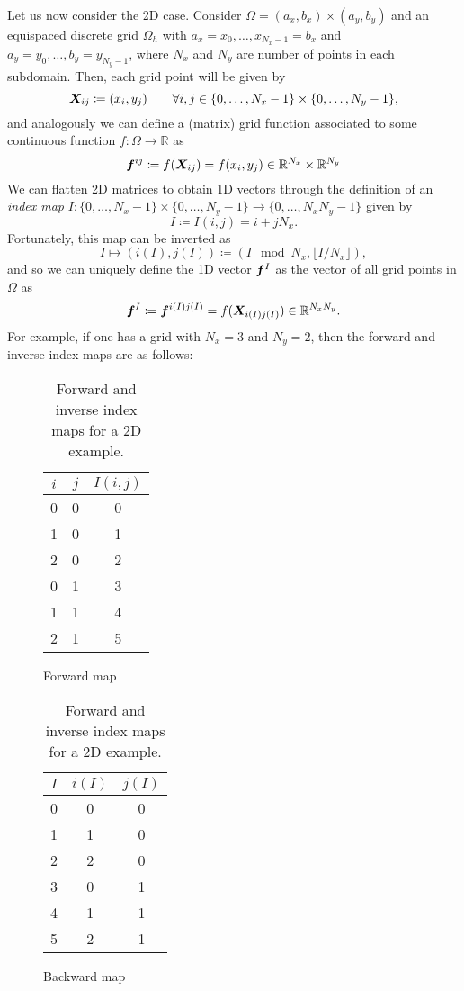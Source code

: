 \documentclass{article}
\renewcommand{\vec}{\vectorsym}
\newcommand{\R}{\mathbb{R}}
\begin{document}
Let us now consider the 2D case. Consider $\Omega = (a_x, b_x) \times (a_y, b_y)$ and an equispaced discrete grid $\Omega_h$ with $ a_x = x_0, \hdots, x_{N_x-1} = b_x$ and $a_y = y_0, \hdots, b_y = y_{N_y-1}$, where $N_x$ and $N_y$ are number of points in each subdomain. Then, each grid point will be given by     
    $$ \vec X_{ij} \coloneqq (x_i, y_j) \qquad \forall i,j \in \{0,\hdots, N_x-1\}\times \{0,\hdots, N_y-1\}, $$
and analogously we can define a (matrix) grid function associated to some continuous function $f:\Omega\to \R$ as 
$$ \vec f^{ij} \coloneqq f(\vec X_{ij}) = f(x_i, y_j) \in \R^{N_x}\times \R^{N_y} $$
We can flatten 2D matrices to obtain 1D vectors through the definition of an \textit{index map} $I: \{0,\hdots, N_x-1\} \times \{0, \hdots, N_y-1\}\to \{0,\hdots, N_xN_y-1\}$ given by 
    $$ I \coloneqq I(i,j) = i + j N_x.$$
Fortunately, this map can be inverted as
    $$ I \mapsto (i(I), j(I)) \coloneqq (I\mod N_x, \lfloor I/N_x \rfloor), $$
and so we can uniquely define the 1D vector $\vec f^I$ as the vector of all grid points in $\Omega$ as
    $$ \vec f^I \coloneqq \vec f^{i(I)j(I)} = f(\vec X_{i(I)j(I)}) \in \R^{N_xN_y}. $$
For example, if one has a grid with $N_x=3$ and $N_y=2$, then the forward and inverse index maps are as follows:
    \begin{table}[ht!]
        \centering
        \begin{subfigure}{0.45\textwidth}
            \centering
        \begin{tabular}{c c | c}
            \toprule $i$ & $j$ & $I(i,j)$ \\ \midrule
            0 & 0 & 0 \\
            1 & 0 & 1 \\
            2 & 0 & 2 \\
            0 & 1 & 3 \\
            1 & 1 & 4 \\
            2 & 1 & 5 \\ \bottomrule
        \end{tabular}
        \caption{Forward map}
        \end{subfigure}
        \begin{subfigure}{0.45\textwidth}
            \centering
        \begin{tabular}{c | c c}
            \toprule $I$ & $i(I)$ & $j(I)$ \\ \midrule
            0 & 0 & 0 \\
            1 & 1 & 0 \\
            2 & 2 & 0 \\
            3 & 0 & 1 \\
            4 & 1 & 1 \\
            5 & 2 & 1 \\ \bottomrule
        \end{tabular}
        \caption{Backward map}
        \end{subfigure}
        \caption{Forward and inverse index maps for a 2D example.}
    \end{table}
\end{document}
